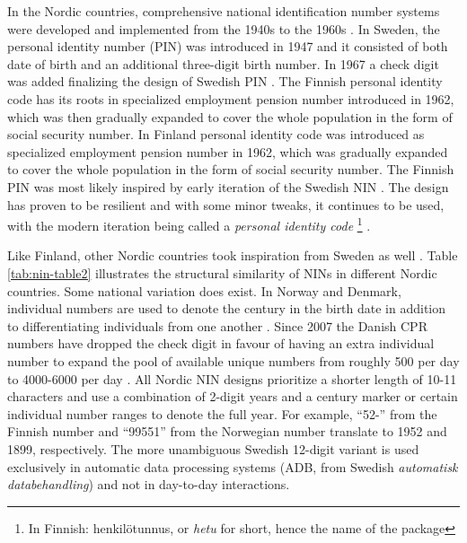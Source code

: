 In the Nordic countries, comprehensive national identification number systems were developed and implemented from the 1940s to the 1960s \citep{watson2010}. In Sweden, the personal identity number (PIN) was introduced in 1947 and it consisted of both date of birth and an additional three-digit birth number. In 1967 a check digit was added finalizing the design of Swedish PIN \citep{johansson2003, scb2016}. The Finnish personal identity code has its roots in specialized employment pension number introduced in 1962, which was then gradually expanded to cover the whole population in the form of social security number. In Finland personal identity code was introduced as specialized employment pension number in 1962, which was gradually expanded to cover the whole population in the form of social security number. The Finnish PIN was most likely inspired by early iteration of the Swedish NIN \citep{alastalo2022}. The design has proven to be resilient and with some minor tweaks, it continues to be used, with the modern iteration being called a \emph{personal identity code} \footnote{In Finnish: henkilötunnus, or \emph{hetu} for short, hence the name of the package} \citep{salste2021}.

Like Finland, other Nordic countries took inspiration from Sweden as well \citep{Krogness2011}. Table \ref{tab:nin-table2} illustrates the structural similarity of NINs in different Nordic countries. Some national variation does exist. In Norway and Denmark, individual numbers are used to denote the century in the birth date in addition to differentiating individuals from one another \citep{furseth2015, cpr2008}. Since 2007 the Danish CPR numbers have dropped the check digit in favour of having an extra individual number to expand the pool of available unique numbers from roughly 500 per day to 4000-6000 per day \citep{cpr2008, jerlach2009}. All Nordic NIN designs prioritize a shorter length of 10-11 characters and use a combination of 2-digit years and a century marker or certain individual number ranges to denote the full year. For example, ``52-'' from the Finnish number and ``99551'' from the Norwegian number translate to 1952 and 1899, respectively. The more unambiguous Swedish 12-digit variant is used exclusively in automatic data processing systems (ADB, from Swedish \emph{automatisk databehandling}) and not in day-to-day interactions.

